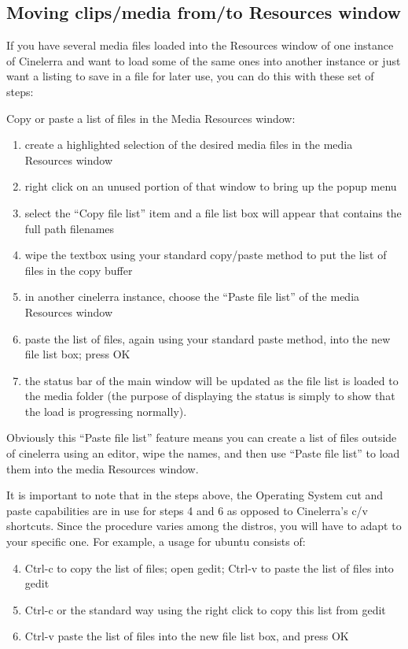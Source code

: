 \subsection{Moving clips/media from/to Resources window}%
\label{sub:moving_clips_media_from_to_resources_window}

If you have several media files loaded into the Resources window of one instance of Cinelerra and want to load some of the same ones into another instance or just want a listing to save in a file for later use, you can do this with these set of steps:

Copy or paste a list of files in the Media Resources window:  


\begin{enumerate}
    \item  create a highlighted selection of the desired media files in the media Resources window
    \item    right click on an unused portion of that window to bring up the popup menu
    \item     select the “Copy file list” item and a file list box will appear that contains the full path filenames
    \item     wipe the textbox using your standard copy/paste method to put the list of files in the copy buffer
    \item     in another cinelerra instance, choose the “Paste file list” of the media Resources window
    \item     paste the list of files, again using your standard paste method, into the new file list box; press OK
    \item    the status bar of the main window will be updated as the file list is loaded to the media folder (the purpose of displaying the status is simply to show that the load is progressing normally).
\end{enumerate}

Obviously this “Paste file list” feature means you can create a list of files outside of cinelerra using an editor, wipe the names, and then use “Paste file list” to load them into the media Resources window.  

It is important to note that in the steps above, the Operating System cut and paste capabilities are in use for steps 4 and 6 as opposed to Cinelerra’s c/v shortcuts.  
Since the procedure varies among the distros, you will have to adapt to your specific one.  For example, a usage for ubuntu consists of:
\begin{enumerate}
    \setcounter{enumi}{3}
    \item   Ctrl-c to copy the list of files; open gedit; Ctrl-v to paste the list of files into gedit
    \item   Ctrl-c or the standard way using the right click to copy this list from gedit
    \item Ctrl-v paste the list of files into the new file list box, and press OK
\end{enumerate}

